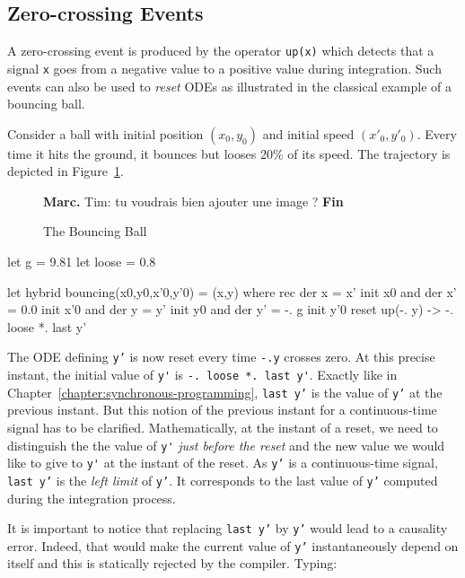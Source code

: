 \documentclass[11pt,titlepage,twoside]{report}
\newcommand{\Marc}[1]{{\bf Marc.} {#1} {\bf Fin}}
\begin{document}
\subsection{Zero-crossing Events}
A zero-crossing event is produced by the operator \texttt{up(x)}
which detects that a signal \texttt{x} goes from a negative value to a
positive value during integration. Such events can also be used
to \emph{reset} \acp{ODE} as illustrated in the classical example of a 
bouncing ball.

Consider a ball with initial position $(x_0, y_0)$ and initial speed
$(x'_0, y'_0)$. Every time it hits the ground, it bounces but looses
20\% of its speed. The trajectory is depicted in Figure~\ref{fig:bouncing-ball}.

\begin{figure}
  \Marc{Tim: tu voudrais bien ajouter une image ?}
\caption{The Bouncing Ball~\label{fig:bouncing-ball}}
\end{figure}

\begin{runverbatim}[label=gravity]
let g = 9.81
let loose = 0.8
\end{runverbatim}
\begin{runverbatim}
let hybrid bouncing(x0,y0,x'0,y'0) = (x,y) where
 rec der x = x' init x0
 and der x' = 0.0 init x'0
 and der y = y' init y0
 and der y' = -. g init y'0 reset up(-. y) -> -. loose *. last y'
\end{runverbatim}

The \ac{ODE} defining \texttt{y'} is now reset every time \texttt{-.y}
crosses zero.  At this precise instant, the initial value of \verb-y'-
is \verb+-. loose *. last y'+. Exactly like in
Chapter~\ref{chapter:synchronous-programming}, \texttt{last y'} is the
value of \texttt{y'} at the previous instant. But this notion of the
previous instant for a continuous-time signal has to be
clarified. Mathematically, at the instant of a reset, we need to
distinguish the the value of \verb-y'- \emph{just before the reset}
and the new value we would like to give to \verb-y'- at the instant of
the reset. As \texttt{y'} is a continuous-time signal, \texttt{last
  y'} is the \emph{left limit} of \texttt{y'}. It corresponds to the
last value of \texttt{y'} computed during the integration process.

It is important to notice that replacing \texttt{last y'} by
\texttt{y'} would lead to a causality error. Indeed, that would make
the current value of \texttt{y'} instantaneously depend on itself and
this is statically rejected by the compiler. Typing:
\end{document}
